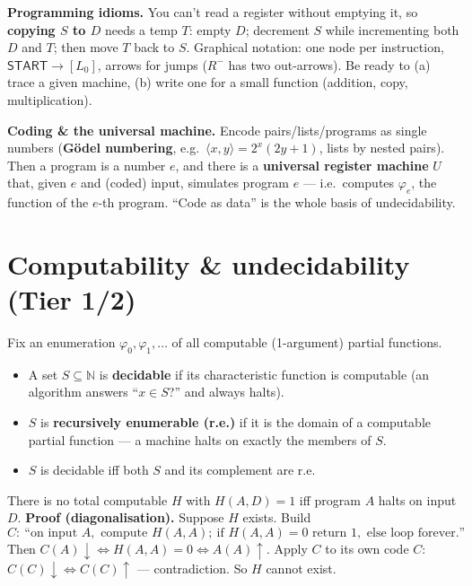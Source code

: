 \documentclass[11pt,a4paper]{article}
\begin{document}
\begin{useful}
\textbf{Programming idioms.} You can't read a register without emptying it, so \textbf{copying $S$ to $D$} needs a temp $T$: empty $D$; decrement $S$ while incrementing both $D$ and $T$; then move $T$ back to $S$. Graphical notation: one node per instruction, $\textsf{START}\to[L_0]$, arrows for jumps ($R^{-}$ has two out-arrows). Be ready to (a) trace a given machine, (b) write one for a small function (addition, copy, multiplication).
\end{useful}

\begin{useful}
\textbf{Coding \& the universal machine.} Encode pairs/lists/programs as single numbers (\textbf{G\"odel numbering}, e.g.\ $\langle x,y\rangle=2^x(2y+1)$, lists by nested pairs). Then a program is a number $e$, and there is a \textbf{universal register machine} $U$ that, given $e$ and (coded) input, simulates program $e$ --- i.e.\ computes $\varphi_e$, the function of the $e$-th program. ``Code as data'' is the whole basis of undecidability.
\end{useful}

\section{Computability \& undecidability (Tier 1/2)}

\begin{must}[title=Decidable, undecidable, r.e.]
Fix an enumeration $\varphi_0,\varphi_1,\dots$ of all computable (1-argument) partial functions.
\begin{itemize}[leftmargin=*,itemsep=0pt]
  \item A set $S\subseteq\mathbb N$ is \textbf{decidable} if its characteristic function is computable (an algorithm answers ``$x\in S$?'' and always halts).
  \item $S$ is \textbf{recursively enumerable (r.e.)} if it is the domain of a computable partial function --- a machine halts on exactly the members of $S$.
  \item $S$ is decidable iff both $S$ and its complement are r.e.
\end{itemize}
\end{must}

\begin{must}[title=The Halting Problem is undecidable]
There is no total computable $H$ with $H(A,D)=1$ iff program $A$ halts on input $D$. \textbf{Proof (diagonalisation).} Suppose $H$ exists. Build
\[
C:\ \text{``on input }A,\text{ compute }H(A,A);\ \text{if }H(A,A)=0\text{ return }1,\text{ else loop forever.''}
\]
Then $C(A){\downarrow}\iff H(A,A)=0\iff A(A){\uparrow}$. Apply $C$ to its own code $C$: $C(C){\downarrow}\iff C(C){\uparrow}$ --- contradiction. So $H$ cannot exist.
\end{must}
\end{document}
